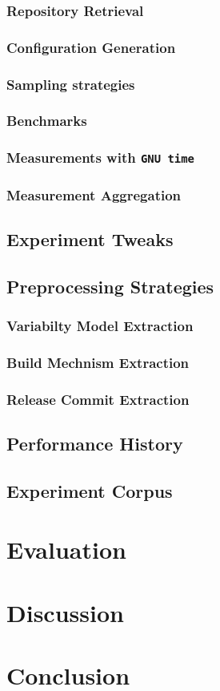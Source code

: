 \documentclass[bibliography=totoc]{tubsreprt}
\begin{document}
\subsection{Repository Retrieval}
\subsection{Configuration Generation}
\cite{batory_feature_2005}

\subsection{Sampling strategies}
\subsection{Benchmarks}
\subsection{Measurements with \texttt{GNU time}}
\subsection{Measurement Aggregation}



\section{Experiment Tweaks}

\section{Preprocessing Strategies}
\subsection{Variabilty Model Extraction}
\subsection{Build Mechnism Extraction}
\subsection{Release Commit Extraction}

\section{Performance History}

\section{Experiment Corpus}

\chapter{Evaluation}

\chapter{Discussion}

\chapter{Conclusion}


\end{document}
